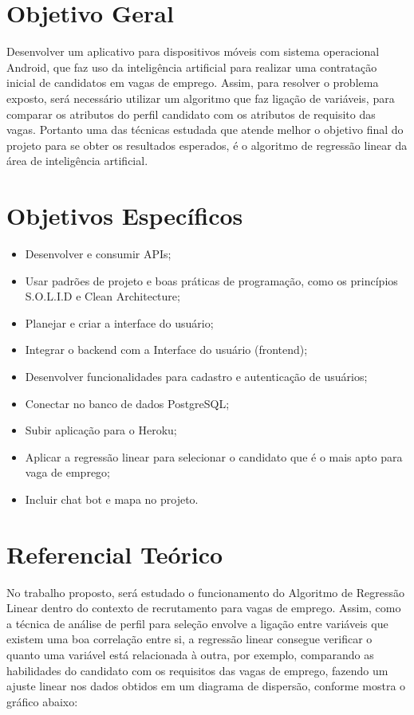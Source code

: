 \documentclass[conference]{IEEEtran}
\begin{document}
\section{Objetivo Geral}
Desenvolver um aplicativo para dispositivos móveis com sistema operacional Android, que faz uso da inteligência artificial para realizar uma contratação inicial de candidatos em vagas de emprego. Assim, para resolver o problema exposto, será necessário utilizar um algoritmo que faz ligação de variáveis, para comparar os atributos do perfil candidato com os atributos de requisito das vagas. Portanto uma das técnicas estudada que atende melhor o objetivo final do projeto para se obter os resultados esperados, é o algoritmo de regressão linear da área de inteligência artificial.

\section{Objetivos Específicos}
\begin{itemize}
\item Desenvolver e consumir APIs; 
\item Usar padrões de projeto e boas práticas de programação, como os princípios S.O.L.I.D e Clean Architecture; 
\item Planejar e criar a interface do usuário;
\item Integrar o backend com a Interface do usuário (frontend); 
\item Desenvolver funcionalidades para cadastro e autenticação de usuários;
\item Conectar no banco de dados PostgreSQL;
\item Subir aplicação para o Heroku;
\item Aplicar a regressão linear para selecionar o candidato que é o mais apto para vaga de emprego;
\item Incluir chat bot e mapa no projeto.
\end{itemize}

\section{Referencial Teórico}
No trabalho proposto, será estudado o funcionamento do Algoritmo de Regressão Linear dentro do contexto de recrutamento para vagas de emprego. Assim, como a técnica de análise de perfil para seleção envolve a ligação entre variáveis que existem uma boa correlação entre si, a regressão linear consegue verificar o quanto uma variável está relacionada à outra, por exemplo, comparando as habilidades do candidato com os requisitos das vagas de emprego, fazendo um ajuste linear nos dados obtidos em um diagrama de dispersão, conforme mostra o gráfico abaixo:
\end{document}
